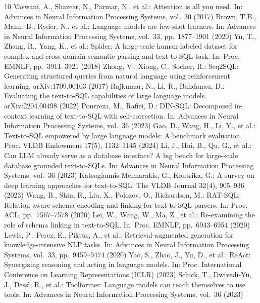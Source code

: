 \documentclass[runningheads]{llncs}
\begin{document}
\begin{thebibliography}{10}
 Vaswani, A., Shazeer, N., Parmar, N., et al.: Attention is all you need. In: Advances in Neural Information Processing Systems, vol.~30 (2017)
 Brown, T.B., Mann, B., Ryder, N., et al.: Language models are few-shot learners. In: Advances in Neural Information Processing Systems, vol.~33, pp.~1877--1901 (2020)
 Yu, T., Zhang, R., Yang, K., et al.: Spider: A large-scale human-labeled dataset for complex and cross-domain semantic parsing and text-to-SQL task. In: Proc. EMNLP, pp.~3911--3921 (2018)
 Zhong, V., Xiong, C., Socher, R.: Seq2SQL: Generating structured queries from natural language using reinforcement learning. arXiv:1709.00103 (2017)
 Rajkumar, N., Li, R., Bahdanau, D.: Evaluating the text-to-SQL capabilities of large language models. arXiv:2204.00498 (2022)
 Pourreza, M., Rafiei, D.: DIN-SQL: Decomposed in-context learning of text-to-SQL with self-correction. In: Advances in Neural Information Processing Systems, vol.~36 (2023)
 Gao, D., Wang, H., Li, Y., et al.: Text-to-SQL empowered by large language models: A benchmark evaluation. Proc. VLDB Endowment 17(5), 1132--1145 (2024)
 Li, J., Hui, B., Qu, G., et al.: Can LLM already serve as a database interface? A big bench for large-scale database grounded text-to-SQLs. In: Advances in Neural Information Processing Systems, vol.~36 (2023)
 Katsogiannis-Meimarakis, G., Koutrika, G.: A survey on deep learning approaches for text-to-SQL. The VLDB Journal 32(4), 905--936 (2023)
 Wang, B., Shin, R., Liu, X., Polozov, O., Richardson, M.: RAT-SQL: Relation-aware schema encoding and linking for text-to-SQL parsers. In: Proc. ACL, pp.~7567--7578 (2020)
 Lei, W., Wang, W., Ma, Z., et al.: Re-examining the role of schema linking in text-to-SQL. In: Proc. EMNLP, pp.~6943--6954 (2020)
 Lewis, P., Perez, E., Piktus, A., et al.: Retrieval-augmented generation for knowledge-intensive NLP tasks. In: Advances in Neural Information Processing Systems, vol.~33, pp.~9459--9474 (2020)
 Yao, S., Zhao, J., Yu, D., et al.: ReAct: Synergizing reasoning and acting in language models. In: Proc. International Conference on Learning Representations (ICLR) (2023)
 Schick, T., Dwivedi-Yu, J., Dess\`i, R., et al.: Toolformer: Language models can teach themselves to use tools. In: Advances in Neural Information Processing Systems, vol.~36 (2023)

\end{thebibliography}
\end{document}

